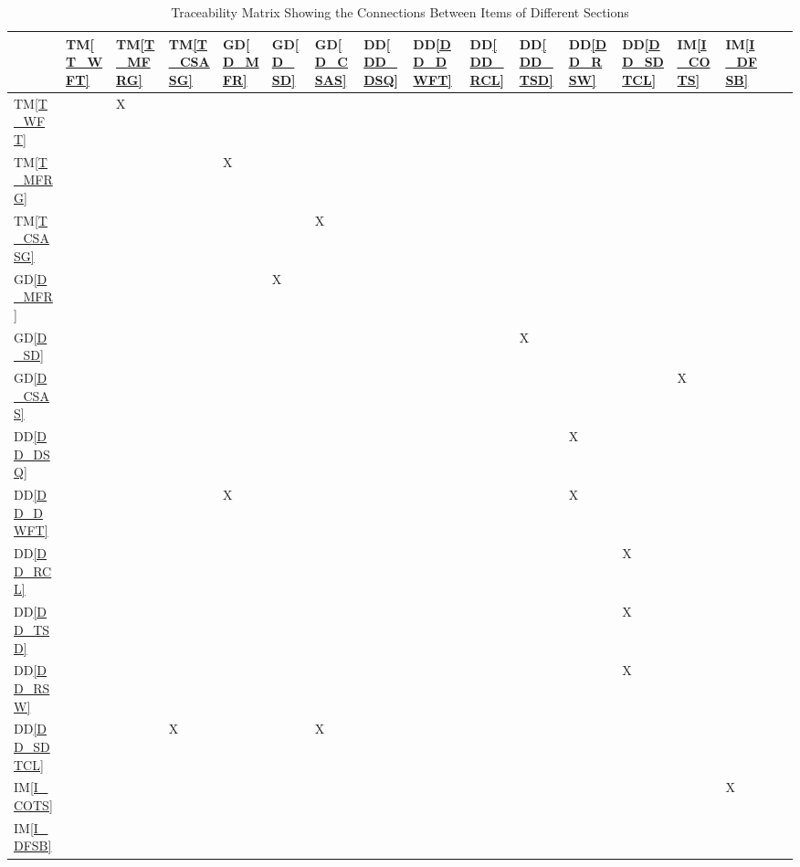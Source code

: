 \documentclass[12pt]{article}
\newcommand{\dref}[1]{GD\ref{#1}}
\newcommand{\ddref}[1]{DD\ref{#1}}
\newcommand{\tref}[1]{TM\ref{#1}}
\newcommand{\iref}[1]{IM\ref{#1}}
\begin{document}
\newpage
\begin{table}[H]
\centering
\begin{tabular}{|p{8mm}|p{8mm}|p{8mm}|p{8mm}|p{8mm}|p{8mm}|p{8mm}|p{8mm}|p{8mm}|p{8mm}|p{8mm}|p{8mm}|p{8mm}|p{8mm}|p{8mm}|p{8mm}|p{8mm}|}
\hline        
	& \tref{T_WFT} & \tref{T_MFRG} & \tref{T_CSASG} & \dref{D_MFR} & \dref{D_SD}  & \dref{D_CSAS} &\ddref{DD_DSQ} & \ddref{DD_DWFT} & \ddref{DD_RCL} &  \ddref{DD_TSD} & \ddref{DD_RSW} &\ddref{DD_SDTCL} & \iref{I_COTS} & \iref{I_DFSB}\\ 
\hline

\tref{T_WFT}          & & X & & & & & & & & & & & & \\ \hline
\tref{T_MFRG}        & & & & X & & & & & & & & & & \\ \hline
\tref{T_CSASG}       & & & & & & X & & & & & & & & \\ \hline
\dref{D_MFR}         & & & & & X & & & & & & & & & \\ \hline
\dref{D_SD}           & & & & & & & & & & X & & & &\\ \hline
\dref{D_CSAS}       & & & & & & & & & & & & & X &\\ \hline
\ddref{DD_DSQ}    & & & & & & & & & & & X & & &\\ \hline
\ddref{DD_DWFT}  & & & & X & & & & & & & X & & &\\ \hline
\ddref{DD_RCL}    & & & & & & & & & & & & X & &\\ \hline
\ddref{DD_TSD}    & & & & & & & & & & & & X & &\\ \hline
\ddref{DD_RSW}    & & & & & & & & & & & & X & & \\ \hline
\ddref{DD_SDTCL}  & & & X & & & X & & & & & & & &\\ \hline
\iref{I_COTS}         & & & & & & & & & & & & & & X \\ \hline
\iref{I_DFSB}         & & & & & & & & & & & & & &\\ 
\hline
\end{tabular}
\caption{Traceability Matrix Showing the Connections Between Items of Different Sections}
\label{Table:A_trace}
\end{table}
\end{document}
